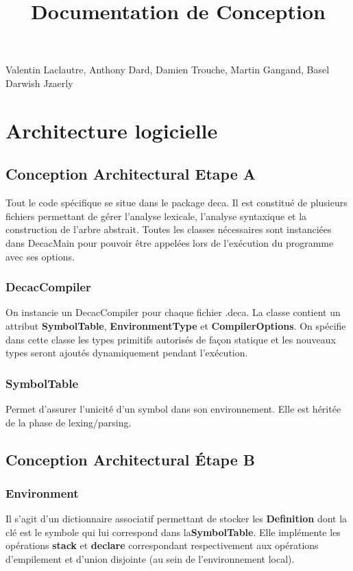 \documentclass[12pt, a4paper, one side]{article}
\title{Documentation de Conception}
\author{}
\date{}
\begin{document}
    \maketitle

    \begin{center}
        Valentin Laclautre, Anthony Dard, Damien Trouche, Martin Gangand, Basel Darwish Jzaerly
    \end{center}

    \tableofcontents

    \newpage

    \section{Architecture logicielle}
    \subsection{Conception Architectural Etape A}
    Tout le code spécifique se situe dans le package deca. Il est constitué de plusieurs fichiers
    permettant de gérer l'analyse lexicale, l'analyse syntaxique et la construction de l'arbre abstrait. Toutes les classes nécessaires sont instanciées dans DecacMain
    pour pouvoir être appelées lors de l'exécution du programme avec ses options.
    \subsubsection{DecacCompiler}
    On instancie un DecacCompiler pour chaque fichier .deca. La classe contient un attribut \textbf{SymbolTable}, \textbf{EnvironmentType} et \textbf{CompilerOptions}.
    On spécifie dans cette classe les types primitifs autorisés de façon statique et les nouveaux types seront ajoutés dynamiquement pendant l'exécution.

    \subsubsection{SymbolTable}
    Permet d'assurer l'unicité d'un symbol dans son environnement.
    Elle est héritée de la phase de lexing/parsing.

    \subsection{Conception Architectural Étape B}

    \subsubsection{Environment}
    Il s'agit d'un dictionnaire associatif permettant de stocker les \textbf{Definition} dont la clé est le symbole qui lui correspond dans la\textbf{SymbolTable}.
    Elle implémente les opérations \textbf{stack} et \textbf{declare} correspondant respectivement aux opérations d'empilement et
    d'union disjointe (au sein de l'environnement local).
\end{document}
